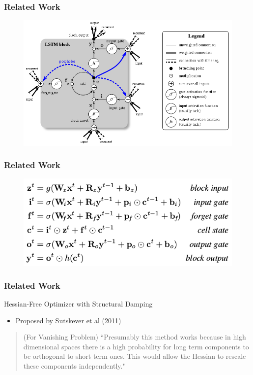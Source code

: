 \documentclass{beamer}
\begin{document}
\begin{frame}
	\frametitle{Related Work}
	
	\begin{figure}
		\includegraphics[width=\textwidth]{imgs/LSTM}
	\end{figure}
\end{frame}


\begin{frame}
	\frametitle{Related Work}
	
	\begin{figure}
		\includegraphics[width=\textwidth]{imgs/LSTM_2}
	\end{figure}
\end{frame}


\begin{frame}
	\frametitle{Related Work}

	\begin{block}{Hessian-Free Optimizer with Structural Damping}
		\begin{itemize}
			\item{Proposed by Sutskever et al (2011)}
		\end{itemize}
		
		\begin{quotation}
			(For Vanishing Problem) ``Presumably this method works because in high dimensional spaces there is a high probability for long term components to be orthogonal to short term ones. This would allow the Hessian  to  rescale  these  components independently."
		\end{quotation}	
	\end{block}
\end{frame}
\end{document}
